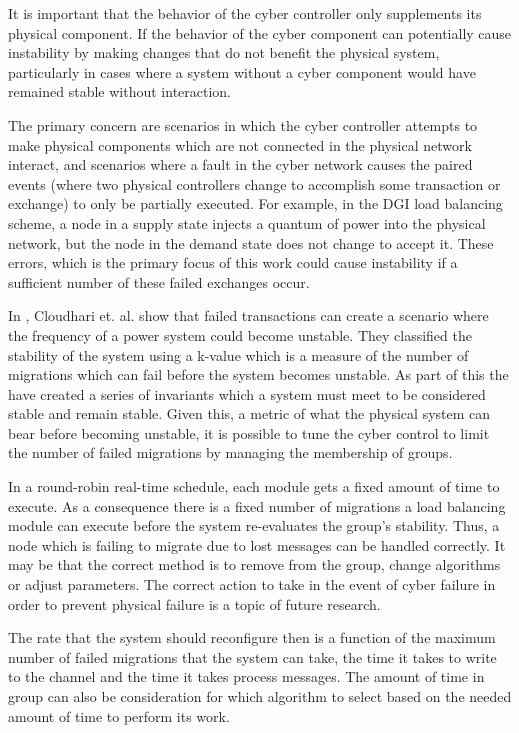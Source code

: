 It is important that the behavior of the cyber controller only supplements its physical component. If the behavior of the cyber component can potentially cause instability by making changes that do not benefit the physical system, particularly in cases where a system without a cyber component would have remained stable without interaction.

The primary concern are scenarios in which the cyber controller attempts to make physical components which are not connected in the physical network interact, and scenarios where a fault in the cyber network causes the paired events (where two physical controllers change to accomplish some transaction or exchange) to only be partially executed. For example, in the DGI load balancing scheme, a node in a supply state injects a quantum of power into the physical network, but the node in the demand state does not change to accept it. These errors, which is the primary focus of this work could cause instability if a sufficient number of these failed exchanges occur.

In \cite{HARINI}, Cloudhari et. al. show that failed transactions can create a scenario where the frequency of a power system could become unstable. They classified the stability of the system using a k-value which is a measure of the number of migrations which can fail before the system becomes unstable. As part of this the have created a series of invariants which a system must meet to be considered stable and remain stable. Given this, a metric of what the physical system can bear before becoming unstable, it is possible to tune the cyber control to limit the number of failed migrations by managing the membership of groups.


In a round-robin real-time schedule, each module gets a fixed amount of time to execute. As a consequence there is a fixed number of migrations a load balancing module can execute before the system re-evaluates the group's stability. Thus, a node which is failing to migrate due to lost messages can be handled correctly. It may be that the correct method is to remove from the group, change algorithms or adjust parameters. The correct action to take in the event of cyber failure in order to prevent physical failure is a topic of future research.

The rate that the system should reconfigure then is a function of the maximum number of failed migrations that the system can take, the time it takes to write to the channel and the time it takes process messages. The amount of time in group can also be consideration for which algorithm to select based on the needed amount of time to perform its work.

